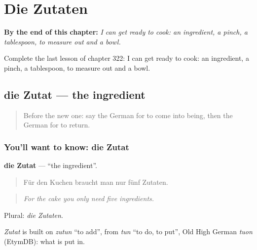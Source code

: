 
\chapter{Die Zutaten}
\label{ch:ge-die-zutaten}

\begin{chapteropening}
\textbf{By the end of this chapter:} \emph{I can get ready to cook: an ingredient, a pinch, a tablespoon, to measure out and a bowl.}

Complete the last lesson of chapter 322: I can get ready to cook: an ingredient, a pinch, a tablespoon, to measure out and a bowl.
\end{chapteropening}

\section[die Zutat]{die Zutat — the ingredient}

\label{lesson:GE-C322-zutat}



\begin{quote}
Before the new one: say the German for to come into being, then the German for to return.
\end{quote}

\subsection*{You'll want to know: die Zutat}
\textbf{die Zutat} — \textquotedblleft{}the ingredient\textquotedblright{}.

\begin{quote}
Für den Kuchen braucht man nur fünf Zutaten.
\end{quote}

\begin{quote}
\emph{For the cake you only need five ingredients.}
\end{quote}

Plural: \emph{die Zutaten}.

\begin{cousinweb}
\emph{Zutat} is built on \emph{zutun} \textquotedblleft{}to add\textquotedblright{}, from \emph{tun} \textquotedblleft{}to do, to put\textquotedblright{}, Old High German \emph{tuon} (EtymDB): what is put in.
\end{cousinweb}

